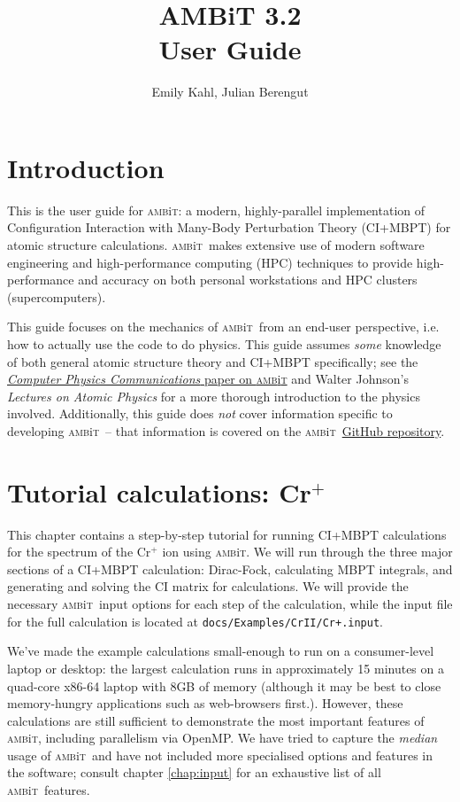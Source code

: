 \documentclass{report}
\newcommand{\ambit}{\textsc{amb}{\footnotesize i}\textsc{t}}
\begin{document}
\title{AMBiT 3.2\\User Guide}
\author{Emily Kahl, Julian Berengut}
\date{}
\maketitle

\tableofcontents

\chapter{Introduction}
This is the user guide for \ambit: a modern, highly-parallel implementation of Configuration Interaction
with Many-Body Perturbation Theory (CI+MBPT) for atomic structure calculations. \ambit\ makes extensive 
use of modern software engineering and high-performance computing (HPC) techniques to provide 
high-performance and accuracy on both personal workstations and HPC clusters (supercomputers).

This guide focuses on the mechanics of \ambit\ from an end-user perspective, i.e. how to actually use the
code to do physics. This guide assumes \emph{some} knowledge of both general atomic structure theory and
CI+MBPT specifically; see the \href{https://doi.org/10.1016/j.cpc.2018.12.014}{\textit{Computer Physics Communications} paper on 
\ambit} and Walter Johnson's \textit{Lectures on Atomic Physics} for a more thorough 
introduction to the physics involved. Additionally, this guide does \emph{not} cover information 
specific to developing \ambit\ -- that information is covered on the \ambit\  
\href{https://github.com/drjuls/AMBiT}{GitHub repository}.

\chapter{Tutorial calculations: Cr$^+$}

This chapter contains a step-by-step tutorial for running CI+MBPT calculations for the spectrum of the
Cr$^+$ ion using \ambit. We will run through the three major sections of a CI+MBPT calculation:
Dirac-Fock, calculating MBPT integrals, and generating and solving the CI matrix for calculations. We
will provide the necessary \ambit\  input options for each step of the calculation, while the input file
for the full calculation is located at \texttt{docs/Examples/CrII/Cr+.input}.

We've made the example calculations small-enough to run on a consumer-level laptop or desktop: the
largest calculation runs in approximately 15 minutes on a quad-core x86-64 laptop with 8GB of
memory (although it may be best to close memory-hungry applications such as web-browsers
first.). However, these calculations are still sufficient to demonstrate the most important features of 
\ambit, including parallelism via OpenMP. We have tried to capture the \textit{median} usage of \ambit\ 
and have not included more specialised options and features in the software; consult chapter
\ref{chap:input} for an exhaustive list of all \ambit\  features.
\end{document}
